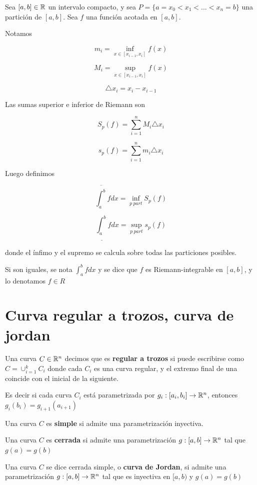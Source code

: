 \begin{definition}[Integrable]
Sea $[a,b] \in \mathbb{R}$ un intervalo compacto, y sea $ P = \{a = x_0 < x_1 < \ldots < x_n = b\}$ una partición de $ [a,b]$.  Sea $f$ una función acotada en $ [a,b]$.  

Notamos 

$$ m_i = \inf_{x \in [x_{i-1},x_i]} f(x) $$

$$ M_i = \sup_{x \in [x_{i-1},x_i]} f(x) $$

$$ \triangle x_i = x_i - x_{i-1}$$

Las sumas superior e inferior de Riemann son

$$ S_p(f) = \sum_{i=1}^n M_i \triangle x_i $$

$$ s_p(f) = \sum_{i=1}^n m_i \triangle x_i $$

Luego definimos

$$ \overline{\int_a^b} f dx = \inf_{p \ part} S_p(f)$$

$$ \underline{\int_a^b} f dx = \sup_{p \ part} s_p(f)$$

donde el ínfimo y el supremo se calcula sobre todas las particiones posibles.

Si son iguales, se nota $ \int_a^b f dx$ y se dice que $f$ es Riemann-integrable en $[a,b]$, y lo denotamos $f \in R$
\end{definition}

\section{Curva regular a trozos, curva de jordan}

\begin{definition}[Jordan]
Una curva $C \in \mathbb{R}^n$ decimos que es \textbf{regular a trozos} si puede escribirse como $\displaystyle C = \cup_{i=1}^k C_i$ donde cada $C_i$ es una curva regular, y el extremo final de una coincide con el inicial de la siguiente.

Es decir si cada curva $C_i$ está parametrizada por $g_i : [a_i, b_i] \to \mathbb{R}^n$, entonces $g_i(b_i) = g_{i+1}(a_{i+1})$

Una curva $C$ es \textbf{simple}  si admite una parametrización inyectiva.

Una curva $C$ es \textbf{cerrada}  si admite una parametrización $g:[a,b] \to \mathbb{R}^n$ tal que $g(a) = g(b)$

Una curva $C$ se dice cerrada simple, o \textbf{curva de Jordan},  si admite una parametrización $ g:[a,b] \to \mathbb{R}^n$ tal que es inyectiva en $ [a,b)$ y $ g(a) = g(b)$
\end{definition}

